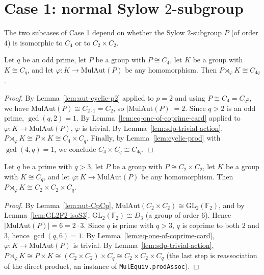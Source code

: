 \section{Case 1: normal Sylow $2$-subgroup}

The two subcases of Case 1 depend on whether the Sylow $2$-subgroup $P$ (of
order $4$) is isomorphic to $C_4$ or to $C_2 \times C_2$.

\begin{lemma}
    \label{lem:case1-c4}
    Let $q$ be an odd prime, let $P$ be a group with $P \cong C_4$, let
    $K$ be a group with $K \cong C_q$, and let
    $\varphi : K \to \mathrm{MulAut}(P)$ be any homomorphism. Then
    $P \rtimes_\varphi K \cong C_{4q}$.
\end{lemma}
\begin{proof}
    By Lemma~\ref{lem:aut-cyclic-p2} applied to $p = 2$ and using
    $P \cong C_4 = C_{2^2}$, we have
    $\mathrm{MulAut}(P) \cong C_{2 \cdot 1} = C_2$, so
    $|\mathrm{MulAut}(P)| = 2$. Since $q > 2$ is an odd prime, $\gcd(q, 2) = 1$.
    By Lemma~\ref{lem:eq-one-of-coprime-card} applied to
    $\varphi : K \to \mathrm{MulAut}(P)$, $\varphi$ is trivial. By
    Lemma~\ref{lem:sdp-trivial-action},
    $P \rtimes_\varphi K \cong P \times K \cong C_4 \times C_q$. Finally, by
    Lemma~\ref{lem:cyclic-prod} with $\gcd(4, q) = 1$, we conclude
    $C_4 \times C_q \cong C_{4q}$.
\end{proof}

\begin{lemma}
    \label{lem:case1-c2c2}
    Let $q$ be a prime with $q > 3$, let $P$ be a group with
    $P \cong C_2 \times C_2$, let $K$ be a group with $K \cong C_q$, and let
    $\varphi : K \to \mathrm{MulAut}(P)$ be any homomorphism. Then
    $P \rtimes_\varphi K \cong C_2 \times C_2 \times C_q$.
\end{lemma}
\begin{proof}
    By Lemma~\ref{lem:aut-CpCp}, $\mathrm{MulAut}(C_2 \times C_2) \cong
    \mathrm{GL}_2(\mathbb{F}_2)$, and by Lemma~\ref{lem:GL2F2-isoS3},
    $\mathrm{GL}_2(\mathbb{F}_2) \cong D_3$ (a group of order $6$). Hence
    $|\mathrm{MulAut}(P)| = 6 = 2 \cdot 3$. Since $q$ is prime with $q > 3$,
    $q$ is coprime to both $2$ and $3$, hence $\gcd(q, 6) = 1$. By
    Lemma~\ref{lem:eq-one-of-coprime-card},
    $\varphi : K \to \mathrm{MulAut}(P)$ is trivial. By
    Lemma~\ref{lem:sdp-trivial-action},
    $P \rtimes_\varphi K \cong P \times K \cong (C_2 \times C_2) \times C_q
    \cong C_2 \times C_2 \times C_q$ (the last step is reassociation of the
    direct product, an instance of \texttt{MulEquiv.prodAssoc}).
\end{proof}

